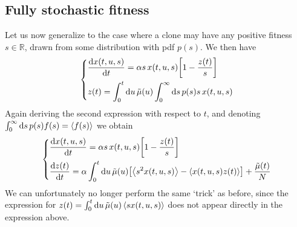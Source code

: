 \documentclass[pdftex,12pt,a4paper]{scrartcl}
\begin{document}
\subsection{Fully stochastic fitness}
Let us now generalize to the case where a clone may have any positive fitness $s \in \mathbb{R}$, drawn from some distribution with pdf $p(s)$. We then have
\begin{equation}
    \left\lbrace
    \begin{aligned}
        &\dv{x(t,u,s)}{t} = \alpha s \, x(t,u,s)\qty[1 - \frac{z(t)}{s}] \\
        &z(t) = \int_0^t \dd{u} \tilde{\mu}(u) \int_0^\infty \dd{s} p(s) s \, x(t,u,s)
    \end{aligned}
    \right.
\end{equation}
Again deriving the second expression with respect to $t$, and denoting $\int_0^\infty \dd{s} p(s) f(s) = \ev{f(s)}$ we obtain
\begin{equation}
    \left\lbrace
    \begin{aligned}
        &\dv{x(t,u,s)}{t} = \alpha s \, x(t,u,s)\qty[1 - \frac{z(t)}{s}] \\
        &\dv{z(t)}{t} = \alpha \int_0^t \dd{u} \tilde{\mu}(u) \qty[ \ev{s^2 x(t,u,s)} - \ev{x(t,u,s) z(t) }] + \frac{\tilde{\mu}(t)}{N}
    \end{aligned}
    \right.
\end{equation}
We can unfortunately no longer perform the same `trick' as before, since the expression for $z(t) = \int_0^t \dd{u} \tilde{\mu}(u) \ev{s x(t,u,s)}$ does not appear directly in the expression above.
\end{document}
